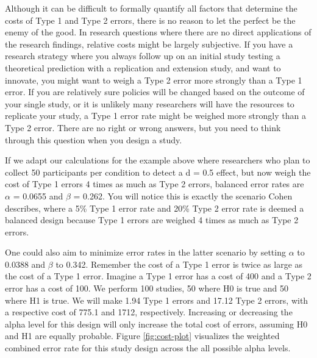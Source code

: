 \documentclass[
  english,
  ,jou,floatsintext]{apa6}
\begin{document}
Although it can be difficult to formally quantify all factors that determine the costs of Type 1 and Type 2 errors, there is no reason to let the perfect be the enemy of the good. In research questions where there are no direct applications of the research findings, relative costs might be largely subjective. If you have a research strategy where you always follow up on an initial study testing a theoretical prediction with a replication and extension study, and want to innovate, you might want to weigh a Type 2 error more strongly than a Type 1 error. If you are relatively sure policies will be changed based on the outcome of your single study, or it is unlikely many researchers will have the resources to replicate your study, a Type 1 error rate might be weighed more strongly than a Type 2 error. There are no right or wrong answers, but you need to think through this question when you design a study.

If we adapt our calculations for the example above where researchers who plan to collect 50 participants per condition to detect a d = 0.5 effect, but now weigh the cost of Type 1 errors 4 times as much as Type 2 errors, balanced error rates are \(\alpha\) = 0.0655 and \(\beta\) = 0.262. You will notice this is exactly the scenario Cohen describes, where a 5\% Type 1 error rate and 20\% Type 2 error rate is deemed a balanced design because Type 1 errors are weighed 4 times as much as Type 2 errors.

One could also aim to minimize error rates in the latter scenario by setting \(\alpha\) to 0.0388 and \(\beta\) to 0.342. Remember the cost of a Type 1 error is twice as large as the cost of a Type 1 error. Imagine a Type 1 error has a cost of 400 and a Type 2 error has a cost of 100. We perform 100 studies, 50 where H0 is true and 50 where H1 is true. We will make 1.94 Type 1 errors and 17.12 Type 2 errors, with a respective cost of 775.1 and 1712, respectively. Increasing or decreasing the alpha level for this design will only increase the total cost of errors, assuming H0 and H1 are equally probable. Figure \ref{fig:cost-plot} visualizes the weighted combined error rate for this study design across the all possible alpha levels.
\end{document}

